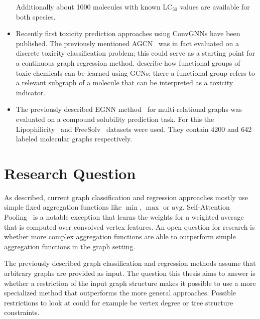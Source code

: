 \documentclass[12pt]{scrartcl}
\begin{document}
\begin{itemize}
		Additionally about 1000 molecules with known $\text{LC}_{50}$ values are available for both species.
	\item Recently first toxicity prediction approaches using ConvGNNs have been published.
		The previously mentioned AGCN~\cite{Li2018} was in fact evaluated on a discrete toxicity classification problem;
		this could serve as a starting point for a continuous graph regression method.
		\citet{Pope2018} describe how functional groups of toxic chemicals can be learned using GCNs;
		there a functional group refers to a relevant subgraph of a molecule that can be interpreted as a toxicity indicator.
	\item The previously described EGNN method~\cite{Gong2018} for multi-relational graphs was evaluated on a compound solubility prediction task.
		For this the Lipophil\-icity~\cite{Wu2017} and FreeSolv~\cite{Mobley2014} datasets were used.
		They contain 4200 and 642 labeled molecular graphs respectively.
\end{itemize}

\section{Research Question}%
\label{sec:question}


As described, current graph classification and regression approaches mostly use simple fixed aggregation functions like $\min$, $\max$ or $\text{avg}$.
Self-Attention Pooling~\cite{Lee2019} is a notable exception that learns the weights for a weighted average that is computed over convolved vertex features.
An open question for research is whether more complex aggregation functions are able to outperform simple aggregation functions in the graph setting.

The previously described graph classification and regression methods assume that arbitrary graphs are provided as input.
The question this thesis aims to answer is whether a restriction of the input graph structure makes it possible to use a more specialized method that outperforms the more general approaches.
Possible restrictions to look at could for example be vertex degree or tree structure constraints.
\end{document}
